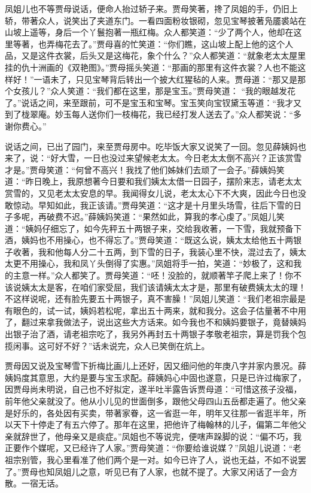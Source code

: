 \begin{parag}
    凤姐儿也不等贾母说话，便命人抬过轿子来。贾母笑著，搀了凤姐的手，仍旧上轿，带著众人，说笑出了夹道东门。一看四面粉妆银砌，忽见宝琴披著凫靥裘站在山坡上遥等，身后一个丫鬟抱著一瓶红梅。众人都笑道：“少了两个人，他却在这里等著，也弄梅花去了。”贾母喜的忙笑道：“你们瞧，这山坡上配上他的这个人品，又是这件衣裳，后头又是这梅花，象个什么？”众人都笑道：“就象老太太屋里挂的仇十洲画的《双艳图》。”贾母摇头笑道：“那画的那里有这件衣裳？人也不能这样好！”一语未了，只见宝琴背后转出一个披大红猩毡的人来。贾母道：“那又是那个女孩儿？”众人笑道：“我们都在这里，那是宝玉。”贾母笑道： “我的眼越发花了。”说话之间，来至跟前，可不是宝玉和宝琴。宝玉笑向宝钗黛玉等道：“我才又到了栊翠庵。妙玉每人送你们一枝梅花，我已经打发人送去了。”众人都笑说：“多谢你费心。”
\end{parag}


\begin{parag}
    说话之间，已出了园门，来至贾母房中。吃毕饭大家又说笑了一回。忽见薛姨妈也来了，说：“好大雪，一日也没过来望候老太太。今日老太太倒不高兴？正该赏雪才是。”贾母笑道：“何曾不高兴！我找了他们姊妹们去顽了一会子。”薛姨妈笑道：“昨日晚上，我原想著今日要和我们姨太太借一日园子，摆阶来志，请老太太赏雪的，又见老太太安息的早。我闻得女儿说，老太太心下不大爽，因此今日也没敢惊动。早知如此，我正该请。”贾母笑道：“这才是十月里头场雪，往后下雪的日子多呢，再破费不迟。”薛姨妈笑道：“果然如此，算我的孝心虔了。”凤姐儿笑道：“姨妈仔细忘了，如今先秤五十两银子来，交给我收著，一下雪，我就预备下酒，姨妈也不用操心，也不得忘了。”贾母笑道：“既这么说，姨太太给他五十两银子收著，我和他每人分二十五两，到下雪的日子，我装心里不快，混过去了，姨太太更不用操心，我和凤丫头倒得了实惠。”凤姐将手一拍，笑道：“妙极了，这和我的主意一样。”众人都笑了。贾母笑道：“呸！没脸的，就顺著竿子爬上来了！你不该说姨太太是客，在咱们家受屈，我们该请姨太太才是，那里有破费姨太太的理！不这样说呢，还有脸先要五十两银子，真不害臊！”凤姐儿笑道：“我们老祖宗最是有眼色的，试一试，姨妈若松呢，拿出五十两来，就和我分。这会子估量著不中用了，翻过来拿我做法子，说出这些大方话来。如今我也不和姨妈要银子，竟替姨妈出银子治了酒，请老祖宗吃了，我另外再封五十两银子孝敬老祖宗，算是罚我个包揽闲事。这可好不好？”话未说完，众人已笑倒在炕上。
\end{parag}


\begin{parag}
    贾母因又说及宝琴雪下折梅比画儿上还好，因又细问他的年庚八字并家内景况。薛姨妈度其意思，大约是要与宝玉求配。薛姨妈心中固也遂意，只是已许过梅家了，因贾母尚未明说，自己也不好拟定，遂半吐半露告诉贾母道：“可惜这孩子没福，前年他父亲就没了。他从小儿见的世面倒多，跟他父母四山五岳都走遍了。他父亲是好乐的，各处因有买卖，带著家眷，这一省逛一年，明年又往那一省逛半年，所以天下十停走了有五六停了。那年在这里，把他许了梅翰林的儿子，偏第二年他父亲就辞世了，他母亲又是痰症。”凤姐也不等说完，便嗐声跺脚的说：“偏不巧，我正要作个媒呢，又已经许了人家。”贾母笑道：“你要给谁说媒？”凤姐儿说道：“老祖宗别管，我心里看准了他们两个是一对。如今已许了人，说也无益，不如不说罢了。”贾母也知凤姐儿之意，听见已有了人家，也就不提了。大家又闲话了一会方散。一宿无话。
\end{parag}


